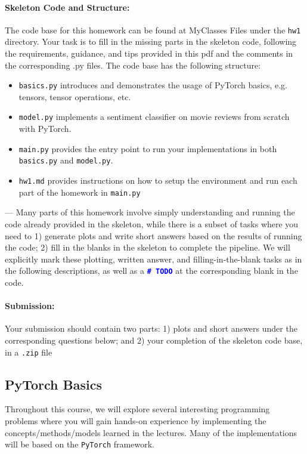 \noindent \paragraph{Skeleton Code and Structure:}
The code base for this homework can be found at MyClasses Files under the \texttt{hw1} directory. Your task is to fill in the missing parts in the skeleton code, following the requirements, guidance, and tips provided in this pdf and the comments in the corresponding .py files.
The code base has the following structure:
\begin{itemize}
    \item \texttt{basics.py} introduces and demonstrates the usage of PyTorch basics, e.g. tensors, tensor operations, etc.
    \item \texttt{model.py} implements a sentiment classifier on movie reviews from scratch with PyTorch.
    \item \texttt{main.py} provides the entry point to run your implementations in both \texttt{basics.py} and \texttt{model.py}.
    \item \texttt{hw1.md} provides instructions on how to setup the environment and run each part of the homework in \texttt{main.py}
\end{itemize}


\noindent \todo{} ---
Many parts of this homework involve simply understanding and running the code already provided in the skeleton, while there is a subset of tasks where you need to 1) generate plots and write short answers based on the results of running the code; 2) fill in the blanks in the skeleton to complete the pipeline. We will explicitly mark these plotting, written answer, and filling-in-the-blank tasks as \todo{} in the following descriptions, as well as a \textcolor{blue}{\texttt{\textbf{\#~TODO}}} at the corresponding blank in the code.

\noindent \paragraph{Submission:} Your submission should contain two parts: 1) plots and short answers under the corresponding questions below; and 2) your completion of the skeleton code base, in a \texttt{.zip} file

\subsection{PyTorch Basics}
Throughout this course, we will explore several interesting programming problems where you will gain hands-on experience by implementing the concepts/methods/models learned in the lectures. Many of the implementations will be based on the \texttt{PyTorch} framework.

